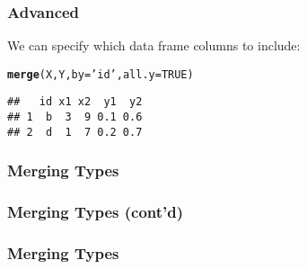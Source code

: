 \documentclass[12pt]{beamer}\usepackage[]{graphicx}\usepackage[]{color}
\makeatletter
\newcommand{\hlnum}[1]{\textcolor[rgb]{0.686,0.059,0.569}{#1}}%
\newcommand{\hlstr}[1]{\textcolor[rgb]{0.192,0.494,0.8}{#1}}%
\newcommand{\hlstd}[1]{\textcolor[rgb]{0.345,0.345,0.345}{#1}}%
\newcommand{\hlkwc}[1]{\textcolor[rgb]{0.333,0.667,0.333}{#1}}%
\newcommand{\hlkwd}[1]{\textcolor[rgb]{0.737,0.353,0.396}{\textbf{#1}}}%
\newenvironment{kframe}{%
 \def\at@end@of@kframe{}%
 \ifinner\ifhmode%
  \def\at@end@of@kframe{\end{minipage}}%
  \begin{minipage}{\columnwidth}%
 \fi\fi%
 \def\FrameCommand##1{\hskip\@totalleftmargin \hskip-\fboxsep
 \colorbox{shadecolor}{##1}\hskip-\fboxsep
     \hskip-\linewidth \hskip-\@totalleftmargin \hskip\columnwidth}%
 \MakeFramed {\advance\hsize-\width
   \@totalleftmargin\z@ \linewidth\hsize
   \@setminipage}}%
 {\par\unskip\endMakeFramed%
 \at@end@of@kframe}
\newenvironment{knitrout}{}{} %
\makeatother
\begin{document}

\begin{frame}[fragile]
\frametitle{Advanced }

We can specify which data frame columns to include:
\begin{knitrout}\footnotesize
{}\color{fgcolor}\begin{kframe}
\begin{alltt}
\hlkwd{merge}\hlstd{(X, Y,} \hlkwc{by} \hlstd{=} \hlstr{'id'}\hlstd{,} \hlkwc{all.y} \hlstd{=} \hlnum{TRUE}\hlstd{)}
\end{alltt}
\begin{verbatim}
##   id x1 x2  y1  y2
## 1  b  3  9 0.1 0.6
## 2  d  1  7 0.2 0.7
\end{verbatim}
\end{kframe}
\end{knitrout}

\end{frame}


\begin{frame}[fragile]
\frametitle{Merging Types}
\begin{center}
\end{center}
\end{frame}


\begin{frame}[fragile]
\frametitle{Merging Types (cont'd)}
\begin{center}
\end{center}
\end{frame}


\begin{frame}[fragile]
\frametitle{Merging Types}
\begin{center}
\end{center}
\end{frame}


\begin{frame}
\begin{center}
\Huge{}
\end{center}
\end{frame}
\end{document}
